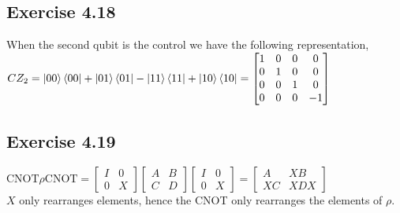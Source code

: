 \documentclass[a4paper,12pt]{article}
\begin{document}
\subsection*{Exercise 4.18}
When the second qubit is the control we have the following representation,\\
$CZ_2=\ket{00}\bra{00}+\ket{01}\bra{01}-\ket{11}\bra{11}+\ket{10}\bra{10}=
\begin{bmatrix}
    1&0&0&0\\
    0&1&0&0\\
    0&0&1&0\\
    0&0&0&-1
\end{bmatrix}$
\subsection*{Exercise 4.19}
$\text{CNOT}\rho\text{CNOT}=\begin{bmatrix}
    I&0\\
    0&X
\end{bmatrix}
\begin{bmatrix}
    A&B\\
    C&D
\end{bmatrix}
\begin{bmatrix}
    I&0\\
    0&X
\end{bmatrix}=
\begin{bmatrix}
    A&XB\\
    XC&XDX
\end{bmatrix}$\\
$X$ only rearranges elements, hence the CNOT only rearranges the elements of $\rho$.
\end{document}
